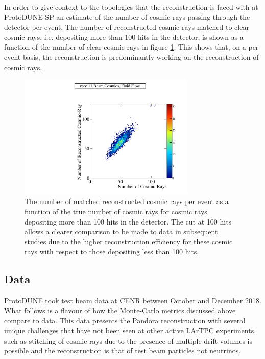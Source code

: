 In order to give context to the topologies that the reconstruction is faced with at ProtoDUNE-SP an estimate of the number of cosmic rays passing through the detector per event.  The number of reconstructed cosmic rays matched to clear cosmic rays, i.e. depositing more than 100 hits in the detector, is shown as a function of the number of clear cosmic rays in figure \ref{fig:crnperevt}.  This shows that, on a per event basis, the reconstruction is predominantly working on the reconstruction of cosmic rays.

\begin{figure}
\centering
\includegraphics[width=0.75\textwidth]{Figures/Metrics/MC/Cosmics/CRMatchesCosmicRayEvent.pdf}
\caption{The number of matched reconstructed cosmic rays per event as a function of the true number of cosmic rays for cosmic rays depositing more than 100 hits in the detector.  The cut at 100 hits allows a clearer comparison to be made to data in subsequent studies due to the higher reconstruction efficiency for these cosmic rays with respect to those depositing less than 100 hits.}
\label{fig:crnperevt}
\end{figure}

\subsection{Data}

ProtoDUNE took test beam data at CENR between October and December 2018.  What follows is a flavour of how the Monte-Carlo metrics discussed above compare to data.  This data presents the Pandora reconstruction with several unique challenges that have not been seen at other active LArTPC experiments, such as stitching of cosmic rays due to the presence of multiple drift volumes is possible and the reconstruction is that of test beam particles not neutrinos.  

